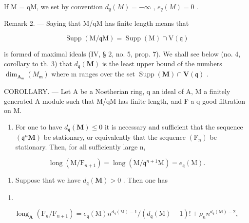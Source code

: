 If M = qM, we set by convention \(d_{q}(M) = -\infty\) , \(e_{q}(M) = 0\) .

Remark 2. --- Saying that M/qM has finite length means that

\[
\operatorname{Supp} (\mathrm{M} / \mathfrak {q} \mathrm{M}) = \operatorname{Supp} (\mathrm{M}) \cap \mathrm{V} (\mathfrak {q})
\]

is formed of maximal ideals (IV, § 2, no. 5, prop. 7). We shall see below (no. 4, corollary to th. 3) that \(d_{\mathfrak{q}}(\mathbf{M})\) is the least upper bound of the numbers \(\dim_{\mathbf{A}_{\mathfrak{m}}}(M_{\mathfrak{m}})\) where m ranges over the set \(\operatorname{Supp}(\mathbf{M}) \cap \mathbf{V}(\mathfrak{q})\) .

COROLLARY. — Let A be a Noetherian ring, q an ideal of A, M a finitely generated A-module such that M/qM has finite length, and F a q-good filtration on M.

\begin{enumerate}
\def\labelenumi{\alph{enumi})}
\tightlist
\item
  For one to have \(d_{\mathfrak{q}}(\mathbf{M}) \leqslant 0\) it is necessary and sufficient that the sequence \((\mathfrak{q}^{n}\mathbf{M})\) be stationary, or equivalently that the sequence \((\mathrm{F}_{n})\) be stationary. Then, for all sufficiently large n,
\end{enumerate}

\[
\operatorname{long} \left(\mathrm{M} / \mathrm{F} _ {n + 1}\right) = \operatorname{long} \left(\mathrm{M} / \mathfrak {q} ^ {n + 1} \mathrm{M}\right) = e _ {\mathfrak {q}} (\mathrm{M}).
\]

\begin{enumerate}
\def\labelenumi{\alph{enumi})}
\setcounter{enumi}{1}
\tightlist
\item
  Suppose that we have \(d_{\mathfrak{q}}(\mathbf{M}) > 0\) . Then one has
\end{enumerate}

\begin{enumerate}
\def\labelenumi{(\arabic{enumi})}
\setcounter{enumi}{12}
\tightlist
\item
\end{enumerate}

\[
\operatorname{long} _ {\mathbf {A}} \left(\mathrm{F} _ {n} / \mathrm{F} _ {n + 1}\right) = e _ {\mathfrak {q}} (\mathrm{M}) n ^ {d _ {\mathfrak {q}} (\mathrm{M}) - 1} / \left(d _ {\mathfrak {q}} (\mathrm{M}) - 1\right)! + \rho_ {n} n ^ {d _ {\mathfrak {q}} (\mathrm{M}) - 2},\tag{14}
\]

